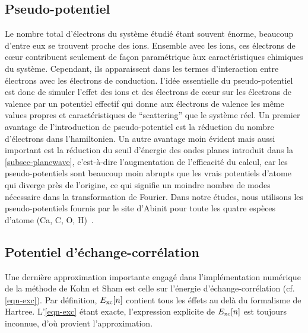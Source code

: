 \subsection{Pseudo-potentiel}
\label{subsec-pseudo}
Le nombre total d'électrons du système étudié étant souvent énorme,
beaucoup d'entre eux se trouvent proche des ions.
Ensemble avec les ions, ces électrons de cœur contribuent seulement de façon paramétrique
àux caractéristiques chimiques du système.
Cependant, ils apparaissent dans les termes d'interaction entre électrons avec les électrons de conduction.
I'idée essentielle du pseudo-potentiel est donc de simuler l'effet des ions et des électrons de cœur
sur les électrons de valence par un potentiel effectif qui donne aux électrons de valence
les même values propres et caractéristiques de ``scattering'' que le système réel.
Un premier avantage de l'introduction de pseudo-potentiel est la réduction du nombre d'électrons dans l'hamiltonien.
Un autre avantage moin évident mais aussi important est la réduction du seuil d'énergie des ondes planes introduit dans la \cref{subsec-planewave},
c'est-à-dire l'augmentation de l'efficacité du calcul, car les pseudo-potentiels sont beaucoup moin abrupts
que les vrais potentiels d'atome qui diverge près de l'origine,
ce qui signifie un moindre nombre de modes nécessaire dans la transformation de Fourier.
Dans notre études, nous utilisons les pseudo-potentiels fournis par le site d'Abinit pour toute les
quatre espèces d'atome (Ca, C, O, H)~\cite{Pseudo}.

\subsection{Potentiel d'échange-corrélation}
\label{subsec-xc}
Une dernière approximation importante engagé dans l'implémentation numérique
de la méthode de Kohn et Sham est celle sur l'énergie d'échange-corrélation (cf. \cref{eqn-exc}).
Par définition, $E_{\textnormal{xc}}[n]$ contient tous les éffets au delà du formalisme de Hartree.
L'\cref{eqn-exc} étant exacte, l'expression explicite de $E_{\textnormal{xc}}[n]$ est toujours inconnue,
d'où provient l'approximation.

